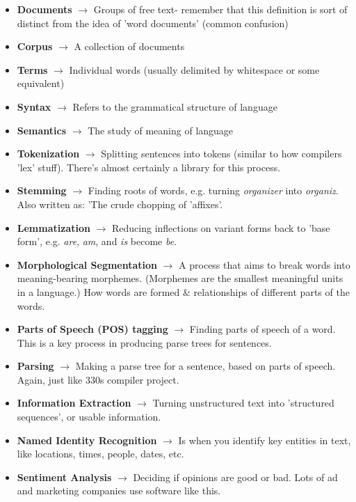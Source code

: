 \documentclass[english, 10pt]{article}
\begin{document}
\begin{itemize}
	\item \textbf{Documents} $\rightarrow$ Groups of free text- remember that this definition is sort of distinct from the idea of 'word documents' (common confusion)
	\item \textbf{Corpus} $\rightarrow$ A collection of documents
	\item \textbf{Terms} $\rightarrow$ Individual words (usually delimited by whitespace or some equivalent)
	\item \textbf{Syntax} $\rightarrow$ Refers to the grammatical structure of language
	\item \textbf{Semantics} $\rightarrow$ The study of meaning of language
	\item \textbf{Tokenization} $\rightarrow$ Splitting sentences into tokens (similar to how compilers 'lex' stuff). There's almost certainly a library for this process.
	\item \textbf{Stemming} $\rightarrow$ Finding roots of words, e.g. turning \textit{organizer} into \textit{organiz}. Also written as: 'The crude chopping of 'affixes'.
	\item \textbf{Lemmatization} $\rightarrow$ Reducing inflections on variant forms back to 'base form', e.g. \textit{are}, \textit{am}, and \textit{is} become \textit{be}.
	\item \textbf{Morphological Segmentation} $\rightarrow$ A process that aims to break words into meaning-bearing morphemes. (Morphemes are the smallest meaningful units in a language.) How words are formed \& relationships of different parts of the words.
	\item \textbf{Parts of Speech (POS) tagging} $\rightarrow$ Finding parts of speech of a word. This is a key process in producing parse trees for sentences.
	\item \textbf{Parsing} $\rightarrow$ Making a parse tree for a sentence, based on parts of speech. Again, just like 330s compiler project.
	\item \textbf{Information Extraction} $\rightarrow$ Turning unstructured text into 'structured sequences', or usable information.
	\item \textbf{Named Identity Recognition} $\rightarrow$ Is when you identify key entities in text, like locations, times, people, dates, etc.
	\item \textbf{Sentiment Analysis} $\rightarrow$ Deciding if opinions are good or bad. Lots of ad and marketing companies use software like this. 
\end{itemize}
\end{document}
